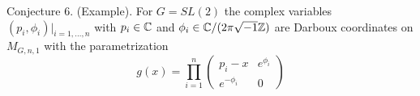 \documentclass[12pt,psamsfonts,reqno]{amsart}
\begin{document}
  Conjecture 6. (Example). For $G = SL(2)$ the complex variables $(p_i, \phi_i)|_{i=1,\dots, n}$ with $p_i \in \mathbb C$ and $\phi_i \in \mathbb C/(2\pi\sqrt{-1}\mathbb Z)$ are Darboux coordinates on $M_{G,n,1}$ with the parametrization
  \begin{equation}
    g(x) = \prod_{i=1}^{n}
    \begin{pmatrix}
      p_i - x & e^{\phi_i} \\
      e^{-\phi_i} & 0 
    \end{pmatrix}
  \end{equation}


%  
\end{document}
